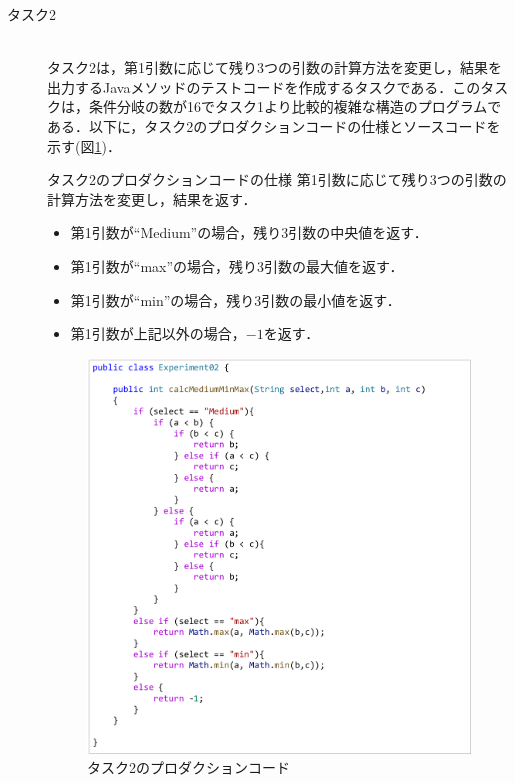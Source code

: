 \documentclass[12pt]{jarticle} %
\begin{document}
\begin{description}
\item[タスク2]~\\
タスク2は，第1引数に応じて残り3つの引数の計算方法を変更し，結果を出力するJavaメソッドのテストコードを作成するタスクである．このタスクは，条件分岐の数が16でタスク1より比較的複雑な構造のプログラムである．以下に，タスク2のプロダクションコードの仕様とソースコードを示す(図\ref{E2})．

\begin{itembox}[l]{タスク2のプロダクションコードの仕様}
第1引数に応じて残り3つの引数の計算方法を変更し，結果を返す．
\begin{itemize}
\item 第1引数が``Medium''の場合，残り3引数の中央値を返す．
\item 第1引数が``max''の場合，残り3引数の最大値を返す．
\item 第1引数が``min''の場合，残り3引数の最小値を返す．
\item 第1引数が上記以外の場合，$-1$を返す．
\end{itemize}
\end{itembox}

\begin{figure}[htbp]
\begin{center}
\includegraphics[clip,width=13cm]{E2.pdf}
\caption{タスク2のプロダクションコード}
\label{E2}
\end{center}
\end{figure}



\end{description}
\end{document}
